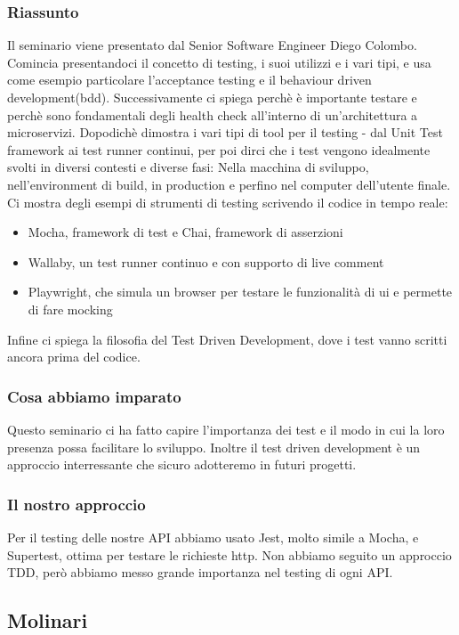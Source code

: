 \documentclass{report}
\begin{document}
\subsubsection*{Riassunto}
Il seminario viene presentato dal Senior Software Engineer Diego Colombo.
Comincia presentandoci il concetto di testing, i suoi utilizzi e i vari tipi, e usa come esempio particolare l'acceptance testing e il behaviour driven development(bdd).
Successivamente ci spiega perchè è importante testare e perchè sono fondamentali degli health check all'interno di un'architettura a microservizi.
Dopodichè dimostra i vari tipi di tool per il testing - dal Unit Test framework ai test runner continui, 
per poi dirci che i test vengono idealmente svolti in diversi contesti e diverse fasi: Nella macchina di sviluppo, nell'environment di build, in production e perfino nel computer dell'utente finale.
Ci mostra degli esempi di strumenti di testing scrivendo il codice in tempo reale:
\begin{itemize}
	\item Mocha, framework di test e Chai, framework di asserzioni 
	\item Wallaby, un test runner continuo e con supporto di live comment
	\item Playwright, che simula un browser per testare le funzionalità di ui e permette di fare mocking
\end{itemize}
Infine ci spiega la filosofia del Test Driven Development, dove i test vanno scritti ancora prima del codice.
\subsubsection*{Cosa abbiamo imparato}
Questo seminario ci ha fatto capire l'importanza dei test e il modo in cui la loro presenza possa facilitare lo sviluppo. Inoltre il test driven development è un approccio interressante che sicuro adotteremo in futuri progetti. 
\subsubsection*{Il nostro approccio}
Per il testing delle nostre API abbiamo usato Jest, molto simile a Mocha, e Supertest, ottima per testare le richieste http. Non abbiamo seguito un approccio TDD, però abbiamo messo grande importanza nel testing di ogni API.

\subsection{Molinari}
\end{document}
